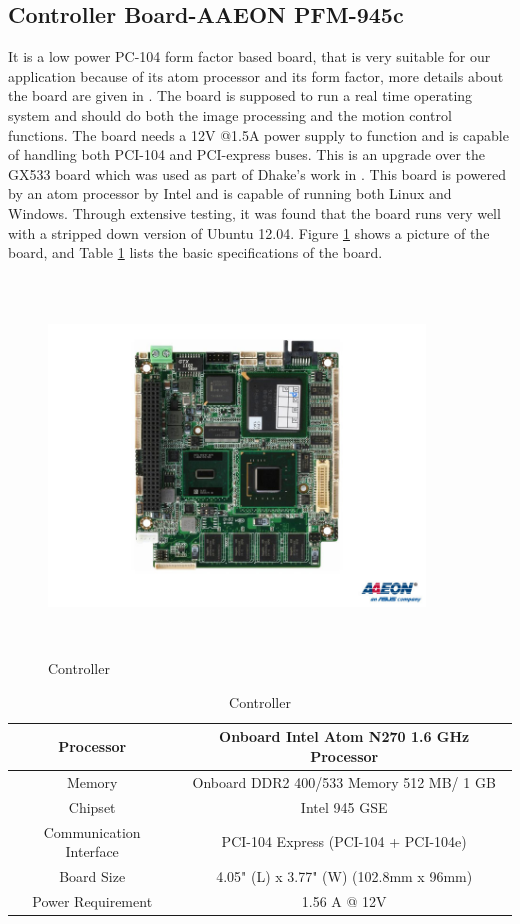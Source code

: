 \subsection{Controller Board-AAEON PFM-945c}
It is a low power PC-104 form factor based board, that is very suitable for our application because of its atom processor and its form factor, more details about the board are given in \cite{Aaeon}. The board is supposed to run a real time operating system and should do both the image processing and the motion control functions. The board needs a 12V @1.5A power supply to function and is capable of handling both PCI-104 and PCI-express buses. This is an upgrade over the GX533 board which was used as part of Dhake's work in \cite{dhake2007real}. This board is powered by an atom processor by Intel and is capable of running both Linux and Windows. Through extensive testing, it was found that the board runs very well with a stripped down version of Ubuntu 12.04. Figure \ref{fig:specs1} shows a picture of the board, and Table \ref{table:Controller} lists the basic specifications of the board. 
\begin{figure}[ht]
    \centering
    \includegraphics[width=10cm,height=10cm,keepaspectratio]{Pictures/controller.jpg}
    \caption{Controller\label{fig:specs1}} 
\end{figure}


\begin {table}[ht]
 \centering
\caption{Controller}
 \begin{tabular}{||c|c||}
 \hline \hline
  Processor   & Onboard Intel Atom N270 1.6 GHz Processor \\
 \hline
  Memory & Onboard DDR2 400/533 Memory 512 MB/ 1 GB \\
 \hline 
  Chipset & Intel 945 GSE \\
  \hline
  Communication Interface & PCI-104 Express (PCI-104 + PCI-104e) \\
  \hline
  Board Size  & 4.05" (L) x 3.77" (W) (102.8mm x 96mm) \\
  \hline
  Power Requirement & 1.56 A @ 12V \\
 \hline\hline
 \end{tabular}


 \label{table:Controller}
 \end{table}


